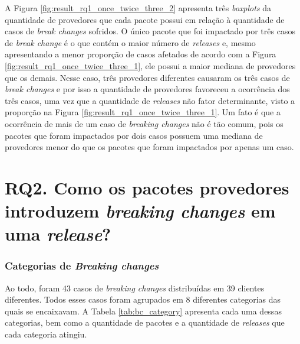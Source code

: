 A Figura \ref{fig:result_rq1_once_twice_three_2} apresenta três \textit{boxplots} da quantidade de provedores que cada pacote possui em relação à quantidade de casos de \textit{break changes} sofridos. O único pacote que foi impactado por três casos de \textit{break change} é o que contém o maior número de \textit{releases} e, mesmo apresentando a menor proporção de casos afetados de acordo com a Figura \ref{fig:result_rq1_once_twice_three_1}, ele possui a maior mediana de provedores que os demais. Nesse caso, três provedores diferentes causaram os três casos de \textit{break changes} e por isso a quantidade de provedores favoreceu a ocorrência dos três casos, uma vez que a quantidade de \textit{releases} não fator determinante, visto a proporção na Figura \ref{fig:result_rq1_once_twice_three_1}.  Um fato é que a ocorrência de mais de um caso de \textit{breaking changes} não é tão comum, pois os pacotes que foram impactados por dois casos possuem uma mediana de provedores menor do que os pacotes que foram impactados por apenas um caso.


\section{RQ2. Como os pacotes provedores introduzem \textit{breaking changes} em uma \textit{release}?}


\subsubsection{Categorias de \textit{Breaking changes}}
Ao todo, foram 43 casos de \textit{breaking changes} distribuídas em 39 clientes diferentes. Todos esses casos foram agrupados em 8 diferentes categorias das quais se encaixavam. A Tabela \ref{tab:bc_category} apresenta cada uma dessas categorias, bem como a quantidade de pacotes e a quantidade de \textit{releases} que cada categoria atingiu.


